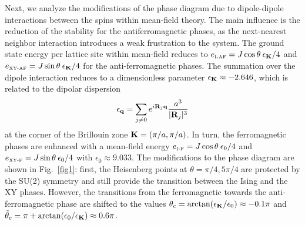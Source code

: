Next, we analyze the modifications of the phase diagram due to dipole-dipole
interactions between the spins within mean-field theory. The
main influence is the reduction of the stability for the antiferromagnetic
phases, as the next-nearest neighbor interaction introduces a  weak frustration
to the system. The ground state energy per lattice site within mean-field
reduces to $  e_{\mbox{\tiny I-AF}} = J \cos \theta \: \epsilon_{\bf K}/4$ and $e_{\mbox{\tiny XY-AF}} = J \sin \theta \: \epsilon_{\bf K}/4$
for the anti-ferromagnetic phases. The summation over the dipole interaction
reduces to a dimensionless parameter $\epsilon_{\bf K} \approx -2.646$, which is related to
the dipolar dispersion
%
\begin{equation}
 \epsilon_{\bf q} = \sum_{j \neq 0} e^{i {\bf R}_{j} {\bf q}}\frac{a^3}{|{\bf R}_{j}|^3}
   \label{dipoledispersion}
\end{equation}
%
at the corner of the Brillouin zone ${\bf K} = (\pi/a, \pi /a)$.
In turn, the ferromagnetic phases are enhanced with a mean-field energy
$e_{\mbox{\tiny I-F}} =  J \cos \theta \: \epsilon_0/4 $  and $ e_{\mbox{\tiny XY-F}} =  J \sin \theta \: \epsilon_0/4$
with $\epsilon_{0}  \approx 9.033$. The modifications to the
phase diagram are shown in Fig.~\ref{fig1}: first, the Heisenberg points at
$\theta = \pi/4,  5 \pi/4$ are protected by the SU(2) symmetry and still
provide the transition between the Ising and the XY phases. However, the
transitions from the ferromagnetic towards the anti-ferromagnetic phase are
shifted to the values  $\theta_{c}= \arctan(\epsilon_{\bf K}/\epsilon_{0})
\approx -0.1 \pi$ and $\tilde{\theta}_c = \pi+ \arctan(\epsilon_{0}/\epsilon_{\bf K})\approx 0.6 \pi$.





